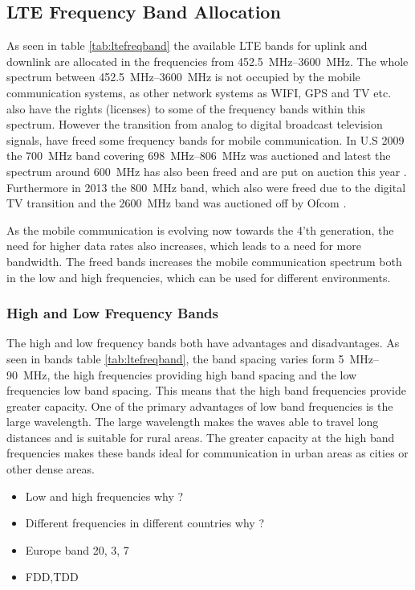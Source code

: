 \subsection{LTE Frequency Band Allocation}
As seen in table \ref{tab:ltefreqband} the available LTE bands for uplink and downlink are allocated in the frequencies from \SIrange{452.5}{3600}{MHz}. The whole spectrum between \SIrange{452.5}{3600}{MHz} is not occupied by the mobile communication systems, as other network systems as WIFI, GPS and TV etc. also have the rights (licenses) to some of the frequency bands within this spectrum.
However the transition from analog to digital broadcast television signals, have freed some frequency bands for mobile communication. In U.S 2009 the \SI{700}{MHz} band covering \SIrange{698}{806}{MHz} was auctioned and latest the spectrum around \SI{600}{MHz} has also been freed and are put on auction this year \cite{Samantha2015tunableAntennas}. Furthermore in 2013 the \SI{800}{MHz} band, which also were freed due to the digital TV transition and the \SI{2600}{MHz} band was auctioned off by Ofcom \cite{james2014lte}.   

As the mobile communication is evolving now towards the 4'th generation, the need for higher data rates also increases, which leads to a need for more bandwidth. The freed bands increases the mobile communication spectrum both in the low and high frequencies, which can be used for different environments.  

\subsubsection{High and Low Frequency Bands}
The high and low frequency bands both have advantages and disadvantages. As seen in bands table \ref{tab:ltefreqband}, the band spacing varies form \SIrange{5}{90}{MHz}, the high frequencies providing high band spacing and the low frequencies low band spacing. This means that the high band frequencies provide greater capacity. One of the primary advantages of low band frequencies is the large wavelength. The large wavelength makes the waves able to travel long distances and is suitable for rural areas.
The greater capacity at the high band frequencies makes these bands ideal for communication in urban areas as cities or other dense areas.
 

  
\begin{itemize}
\item Low and high frequencies why ?
\item Different frequencies in different countries why ?
\item Europe band 20, 3, 7
\item FDD,TDD
\end{itemize}

